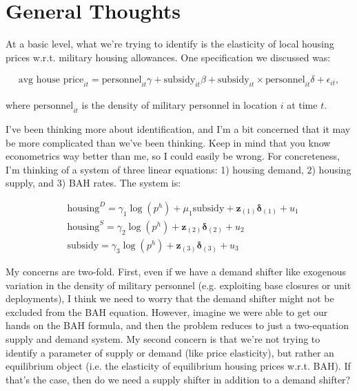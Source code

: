 \documentclass{article}
\begin{document}

\newpage

\section{General Thoughts}

At a basic level, what we're trying to identify is the elasticity of local housing prices w.r.t. military housing allowances. One specification we discussed was:

\begin{align}
\text{avg house price}_{it} = \text{personnel}_{it} \gamma + \text{subsidy}_{it} \beta + \text{subsidy}_{it} \times \text{personnel}_{it} \delta + \epsilon_{it},
\end{align}

\noindent where $\text{personnel}_{it}$ is the density of military personnel in location $i$ at time $t$. 

I've been thinking more about identification, and I'm a bit concerned that it may be more complicated than we've been thinking. Keep in mind that you know econometrics way better than me, so I could easily be wrong. For concreteness, I'm thinking of a system of three linear equations: 1) housing demand, 2) housing supply, and 3) BAH rates. The system is:

\begin{align}
& \nonumber \text{housing}^D = \gamma_1 \log(p^h) + \mu_1 \text{subsidy} + \mathbf{z}_{(1)} \boldsymbol{\delta}_{(1)} + u_1 \\
& \text{housing}^S = \gamma_2 \log(p^h) + \mathbf{z}_{(2)} \boldsymbol{\delta}_{(2)} + u_2 \\
& \nonumber \text{subsidy} = \gamma_3 \log(p^h) + \mathbf{z}_{(3)} \boldsymbol{\delta}_{(3)} + u_3
\end{align}

My concerns are two-fold. First, even if we have a demand shifter like exogenous variation in the density of military personnel (e.g. exploiting base closures or unit deployments), I think we need to worry that the demand shifter might not be excluded from the BAH equation. However, imagine we were able to get our hands on the BAH formula, and then the problem reduces to just a two-equation supply and demand system. My second concern is that we're not trying to identify a parameter of supply or demand (like price elasticity), but rather an equilibrium object (i.e. the elasticity of equilibrium housing prices w.r.t. BAH). If that's the case, then do we need a supply shifter in addition to a demand shifter?
\end{document}
